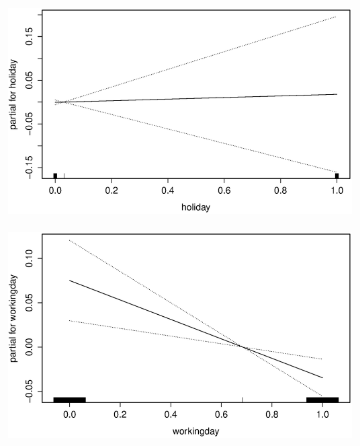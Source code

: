 \begin{figure}[H]
        \medskip
        \begin{subfigure}{0.4\textwidth}
          \includegraphics[width=\columnwidth]{images/non-linear/gam/gam-holiday.eps}
        \end{subfigure}
        \hspace*{\fill}
        \begin{subfigure}{.4\textwidth}
          \includegraphics[width=\columnwidth]{images/non-linear/gam/gam-working-day.eps}
        \end{subfigure}


\end{figure}
